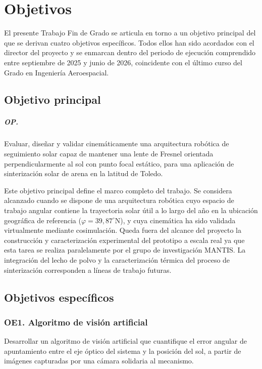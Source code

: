 \chapter{Objetivos}
\label{ch:objetivos}

El presente Trabajo Fin de Grado se articula en torno a un objetivo principal del que se derivan cuatro objetivos específicos. Todos ellos han sido acordados con el director del proyecto y se enmarcan dentro del periodo de ejecución comprendido entre septiembre de 2025 y junio de 2026, coincidente con el último curso del Grado en Ingeniería Aeroespacial.

\section{Objetivo principal}
\paragraph{OP.}
Evaluar, diseñar y validar cinemáticamente una arquitectura robótica de seguimiento solar capaz de mantener una lente de Fresnel orientada perpendicularmente al sol con punto focal estático, para una aplicación de sinterización solar de arena en la latitud de Toledo.

\medskip

Este objetivo principal define el marco completo del trabajo. Se considera alcanzado cuando se dispone de una arquitectura robótica cuyo espacio de trabajo angular contiene la trayectoria solar útil a lo largo del año en la ubicación geográfica de referencia ($\varphi = 39{,}87^{\circ}\mathrm{N}$), y cuya cinemática ha sido validada virtualmente mediante cosimulación. Queda fuera del alcance del proyecto la construcción y caracterización experimental del prototipo a escala real ya que esta tarea se realiza paralelamente por el grupo de investigación MANTIS. La integración del lecho de polvo y la caracterización térmica del proceso de sinterización corresponden a líneas de trabajo futuras.

\section{Objetivos específicos}
\subsection{OE1. Algoritmo de visión artificial}
Desarrollar un algoritmo de visión artificial que cuantifique el error angular de apuntamiento entre el eje óptico del sistema y la posición del sol, a partir de imágenes capturadas por una cámara solidaria al mecanismo.

